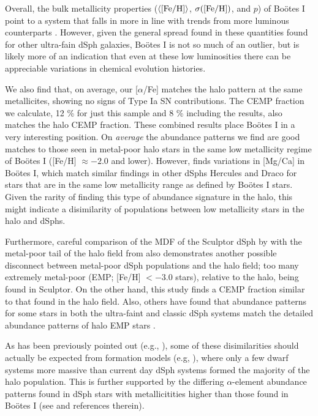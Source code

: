 \documentclass[iop]{emulateapj}
\def\bootes{Bo\"{o}tes I}
\begin{document}
Overall, the bulk metallicity properties ($\langle {\rm
  [Fe/H]} \rangle$, $\sigma({\rm [Fe/H]})$, and $p$) of \bootes{} point to a
system that falls in more in line with trends from more luminous
counterparts \citep{woo08,kirby11a}. However, given the general spread
found in these quantities found for other ultra-fain dSph galaxies,
\bootes{} is not so much of an outlier, but is likely more
of an indication that even at these low luminosities there can be
appreciable variations in chemical evolution histories.

We also find that, on average, our [$\alpha$/Fe] matches the halo
pattern at the same metallicites, showing no signs of Type Ia SN
contributions. The CEMP fraction we calculate, 12 \% for just this
sample and 8 \% including the \citet{norris10b} results, also matches
the halo CEMP fraction. These combined results place \bootes{} in a
very interesting position. On {\it average} the abundance patterns we
find are good matches to those seen in metal-poor halo stars in the
same low metallicity regime of \bootes{} ([Fe/H] $\approx -2.0$ and
lower). However, \citet{feltzing09}
finds variations in [Mg/Ca] in \bootes{}, which match similar findings
in other dSphs Hercules \citep{koch08} and Draco \citep{fulbright04}
for stars that are in the same low metallicity range as defined by
\bootes{} stars. Given the rarity of finding this type of abundance
signature in the halo, this might indicate a disimilarity of
populations between low metallicity stars in the halo and dSphs.

Furthermore, careful comparison of the MDF of the Sculptor dSph by
\citet{kirby09} with the metal-poor tail of the halo field from
\citet{schorck09} also demonstrates another possible disconnect
between metal-poor dSph populations and the halo field; too many
extremely metal-poor (EMP; [Fe/H] $< -3.0$ stars), relative to the
halo, being found in Sculptor. On the other hand, this study finds a
CEMP fraction similar to that found in the halo field. Also, others
have found that abundance patterns for some stars in both the
ultra-faint and classic dSph systems match the detailed abundance
patterns of halo EMP stars \citep{frebel10a,frebel10b, norris10c}.

As has been previously pointed out (e.g., \citealt{kirby09}), some of
these disimilarities should actually be expected from formation
models (e.g, \citealt{robertson05,font06}), where only a
few dwarf systems more massive than current day dSph systems formed
the majority of the halo population. This is further supported by the
differing $\alpha$-element abundance patterns found in dSph stars with
metallicitities higher than those found in \bootes{} (see 
\citealt{geisler07} and references therein).
\end{document}
